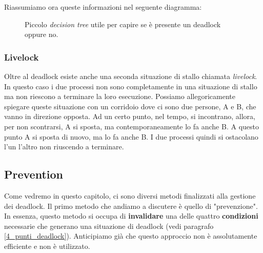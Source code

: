 Riassumiamo ora queste informazioni nel seguente diagramma: 
\begin{figure}[h]
    \centering

    
    \caption{Piccolo \textit{decision tree} utile per capire se è presente un deadlock oppure no.}
    \label{fig:deadlock_decision_tree}
\end{figure}
% 
\subsubsection*{Livelock}
Oltre al deadlock esiste anche una seconda situazione di stallo chiamata \textit{livelock}. In questo caso i due processi non sono completamente in una situazione di stallo ma non riescono a terminare la loro esecuzione. Possiamo allegoricamente spiegare queste situazione con un corridoio dove ci sono due persone, A e B, che vanno in direzione opposta. Ad un certo punto, nel tempo, si incontrano, allora, per non scontrarsi, A si sposta, ma contemporaneamente lo fa anche B. A questo punto A si sposta di nuovo, ma lo fa anche B. I due processi quindi si ostacolano l'un l'altro non riuscendo a terminare. 
% 
\subsection*{Prevention}
Come vedremo in questo capitolo, ci sono diversi metodi finalizzati alla gestione dei deadlock. Il primo metodo che andiamo a discutere è quello di "prevenzione". In essenza, questo metodo si occupa di \textbf{invalidare} una delle quattro \textbf{condizioni} necessarie che generano una situazione di deadlock (vedi paragrafo \ref{4_punti_deadlock}). Anticipiamo già che questo approccio non è assolutamente efficiente e non è utilizzato.

